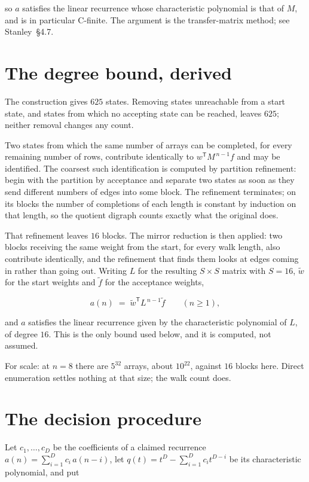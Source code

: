 \documentclass[11pt]{article}
\theoremstyle{definition}
\begin{document}
so $a$ satisfies the linear recurrence whose characteristic polynomial is that of $M$, and is in particular C-finite. The argument is the transfer-matrix method; see Stanley~\S4.7.

\section{The degree bound, derived}

The construction gives $625$ states. Removing states unreachable from a start state, and states from which no accepting state can be reached, leaves $625$; neither removal changes any count.

Two states from which the same number of arrays can be completed, for every remaining number of rows, contribute identically to $w^{\mathsf T}M^{\,n-1}f$ and may be identified. The coarsest such identification is computed by partition refinement: begin with the partition by acceptance and separate two states as soon as they send different numbers of edges into some block. The refinement terminates; on its blocks the number of completions of each length is constant by induction on that length, so the quotient digraph counts exactly what the original does.

That refinement leaves $16$ blocks. The mirror reduction is then applied: two blocks receiving the same weight from the start, for every walk length, also contribute identically, and the refinement that finds them looks at edges coming in rather than going out. Writing $L$ for the resulting $S \times S$ matrix with $S = 16$, $\tilde w$ for the start weights and $\tilde f$ for the acceptance weights,

\[a(n) \;=\; \tilde w^{\mathsf T} L^{\,n-1} \tilde f \qquad (n \ge 1),\]

and $a$ satisfies the linear recurrence given by the characteristic polynomial of $L$, of degree $16$. This is the only bound used below, and it is computed, not assumed.

For scale: at $n = 8$ there are $5^{32}$ arrays, about $10^{22}$, against $16$ blocks here. Direct enumeration settles nothing at that size; the walk count does.

\section{The decision procedure}

Let $c_1,\dots,c_D$ be the coefficients of a claimed recurrence $a(n) = \sum_{i=1}^{D} c_i\,a(n-i)$, let $q(t) = t^{D} - \sum_{i=1}^{D} c_i t^{D-i}$ be its characteristic polynomial, and put
\end{document}
